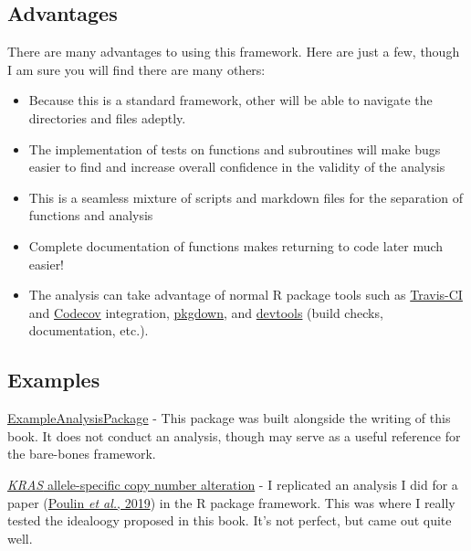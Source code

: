 \documentclass[]{book}
\providecommand{\tightlist}{%
  \setlength{\itemsep}{0pt}\setlength{\parskip}{0pt}}
\begin{document}
\hypertarget{advantages}{%
\subsection*{Advantages}\label{advantages}}

There are many advantages to using this framework. Here are just a few, though I am sure you will find there are many others:

\begin{itemize}
\tightlist
\item
  Because this is a standard framework, other will be able to navigate the directories and files adeptly.
\item
  The implementation of tests on functions and subroutines will make bugs easier to find and increase overall confidence in the validity of the analysis
\item
  This is a seamless mixture of scripts and markdown files for the separation of functions and analysis
\item
  Complete documentation of functions makes returning to code later much easier!
\item
  The analysis can take advantage of normal R package tools such as \href{https://travis-ci.org}{Travis-CI} and \href{https://codecov.io}{Codecov} integration, \href{https://pkgdown.r-lib.org}{pkgdown}, and \href{https://devtools.r-lib.org}{devtools} (build checks, documentation, etc.).
\end{itemize}

\hypertarget{examples}{%
\subsection*{Examples}\label{examples}}

\href{https://github.com/jhrcook/ExampleAnalysisPackage}{ExampleAnalysisPackage} - This package was built alongside the writing of this book. It does not conduct an analysis, though may serve as a useful reference for the bare-bones framework.

\href{https://github.com/jhrcook/KrasAlleleCna}{\emph{KRAS} allele-specific copy number alteration} - I replicated an analysis I did for a paper (\href{http://cancerdiscovery.aacrjournals.org/content/early/2019/04/05/2159-8290.CD-18-1220}{Poulin \emph{et al.}, 2019}) in the R package framework. This was where I really tested the idealoogy proposed in this book. It's not perfect, but came out quite well.
\end{document}
